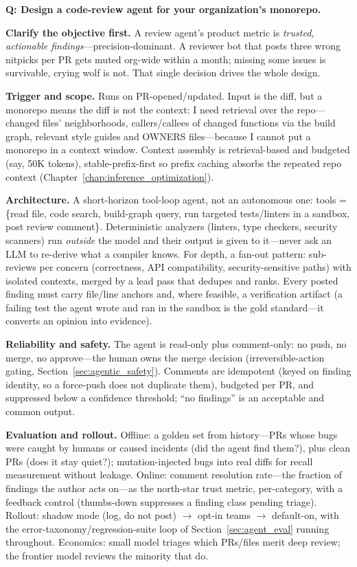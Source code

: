 \begin{interviewq}
\textbf{Q: Design a code-review agent for your organization's monorepo.}

 \quad {} \quad \badgefreq{\freqhigh}

\stronganswer

\textbf{Clarify the objective first.} A review agent's product metric is \textit{trusted, actionable findings}---precision-dominant. A reviewer bot that posts three wrong nitpicks per PR gets muted org-wide within a month; missing some issues is survivable, crying wolf is not. That single decision drives the whole design.

\textbf{Trigger and scope.} Runs on PR-opened/updated. Input is the diff, but a monorepo means the diff is not the context: I need retrieval over the repo---changed files' neighborhoods, callers/callees of changed functions via the build graph, relevant style guides and OWNERS files---because I cannot put a monorepo in a context window. Context assembly is retrieval-based and budgeted (say, 50K tokens), stable-prefix-first so prefix caching absorbs the repeated repo context (Chapter~\ref{chap:inference_optimization}).

\textbf{Architecture.} A short-horizon tool-loop agent, not an autonomous one: tools = \{read file, code search, build-graph query, run targeted tests/linters in a sandbox, post review comment\}. Deterministic analyzers (linters, type checkers, security scanners) run \textit{outside} the model and their output is given to it---never ask an LLM to re-derive what a compiler knows. For depth, a fan-out pattern: sub-reviews per concern (correctness, API compatibility, security-sensitive paths) with isolated contexts, merged by a lead pass that dedupes and ranks. Every posted finding must carry file/line anchors and, where feasible, a verification artifact (a failing test the agent wrote and ran in the sandbox is the gold standard---it converts an opinion into evidence).

\textbf{Reliability and safety.} The agent is read-only plus comment-only: no push, no merge, no approve---the human owns the merge decision (irreversible-action gating, Section~\ref{sec:agentic_safety}). Comments are idempotent (keyed on finding identity, so a force-push does not duplicate them), budgeted per PR, and suppressed below a confidence threshold; ``no findings'' is an acceptable and common output.

\textbf{Evaluation and rollout.} Offline: a golden set from history---PRs whose bugs were caught by humans or caused incidents (did the agent find them?), plus clean PRs (does it stay quiet?); mutation-injected bugs into real diffs for recall measurement without leakage. Online: comment resolution rate---the fraction of findings the author acts on---as the north-star trust metric, per-category, with a feedback control (thumbs-down suppresses a finding class pending triage). Rollout: shadow mode (log, do not post) $\rightarrow$ opt-in teams $\rightarrow$ default-on, with the error-taxonomy/regression-suite loop of Section~\ref{sec:agent_eval} running throughout. Economics: small model triages which PRs/files merit deep review; the frontier model reviews the minority that do.


\end{interviewq}
